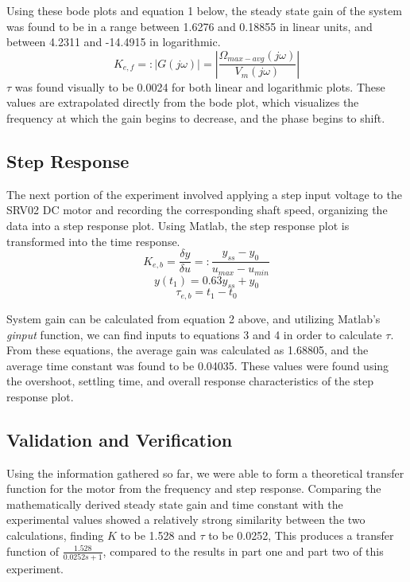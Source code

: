 \documentclass[conference,compsoc]{IEEEtran}
\begin{document}
  Using these bode plots and equation 1 below, the steady state gain of the system was found to be in a range between 1.6276 and 0.18855 in linear units, and between 4.2311 and -14.4915 in logarithmic.
  \begin{equation}
    K_{e,f}=:|G(j\omega)|=|\frac{\Omega_{max-avg}(j\omega)}{V_m(j\omega)}|
  \end{equation}
  $\tau$ was found visually to be 0.0024 for both linear and logarithmic plots. These values are extrapolated directly from the bode plot, which visualizes the frequency at which the gain begins to decrease, and the phase begins to shift.

  \subsection{Step Response}

  The next portion of the experiment involved applying a step input voltage to the SRV02 DC motor and recording the corresponding shaft speed, organizing the data into a step response plot. Using Matlab, the step response plot is transformed into the time response.
  \begin{equation}
    K_{e,b}=\frac{\delta y}{\delta u}=:\frac{y_{ss}-y_{0}}{u_{max}-u_{min}}
  \end{equation}
  \begin{equation}
    y(t_{1})=0.63y_{ss}+y_{0}
  \end{equation}
  \begin{equation}
    \tau_{e,b}=t_{1}-t_{0}
  \end{equation}

  System gain can be calculated from equation 2 above, and utilizing Matlab's \textit{ginput} function, we can find inputs to equations 3 and 4 in order to calculate $\tau$.
  From these equations, the average gain was calculated as 1.68805, and the average time constant was found to be 0.04035. These values were found using the overshoot, settling time, and overall response characteristics of the step response plot.

  \subsection{Validation and Verification}
  Using the information gathered so far, we were able to form a theoretical transfer function for the motor from the frequency and step response. Comparing the mathematically derived steady state gain and time constant with the experimental values showed a relatively strong similarity between the two calculations, finding $K$ to be 1.528 and $\tau$ to be 0.0252, This produces a transfer function of $\frac{1.528}{0.0252s+1}$, compared to the results in part one and part two of this experiment.
\end{document}
